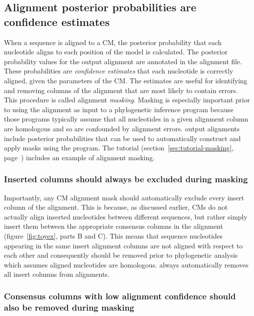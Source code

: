 \subsection{Alignment posterior probabilities are confidence estimates}
\label{sec:background-pp}

When a sequence is aligned to a CM, the posterior probability that each
nucleotide aligns to each position of the model is calculated.  The
posterior probability values for the output alignment are annotated in
the alignment file. These probabilities are \emph{confidence
  estimates} that each nucleotide is correctly aligned, given the
parameters of the CM. The estimates are useful for identifying and
removing columns of the alignment that are most likely to contain
errors. This procedure is called alignment \emph{masking}. Masking is
especially important prior to using the alignment as input to a
phylogenetic inference program because those programs typically assume
that all nucleotides in a given alignment column are homologous and so
are confounded by alignment errors.  output alignments
include posterior probabilities that can be used to automatically
construct and apply masks using the  program. The
tutorial (section~\ref{sec:tutorial-masking},
page~\pageref{sec:tutorial-masking}) includes an example of alignment
masking.

\subsubsection{Inserted columns should always be excluded during masking}

Importantly, any CM alignment mask should automatically exclude every
insert column of the alignment. This is because, as discussed earlier,
CMs do not actually align inserted nucleotides between different
sequences, but rather simply insert them between the appropriate
consensus columns in the alignment (figure~\ref{fig:toyex}, parts B
and C). This means that sequence nucleotides appearing in the same
insert alignment columns are not aligned with respect to each other
and consequently should be removed prior to phylogenetic analysis
which assumes aligned nucleotides are homologous.  
always automatically removes all insert columns from alignments.

\subsubsection{Consensus columns with low alignment confidence should
  also be removed during masking}

